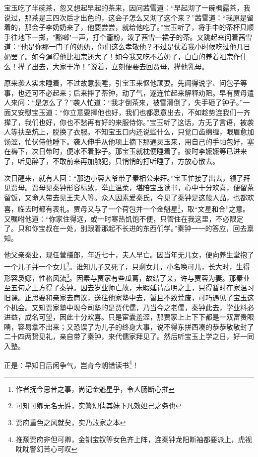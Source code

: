 \documentclass[12pt,oneside]{book}
\begin{document}
宝玉吃了半碗茶，忽又想起早起的茶来，因问茜雪道：“早起沏了一碗枫露茶，我说过，那茶是三四次后才出色的，这会子怎么又沏了这个来？”茜雪道：“我原是留着的，那会子李奶奶来了，他要尝尝，就给他吃了。”宝玉听了，将手中的茶杯只顺手往地下一掷，"豁啷"一声，打个齑粉，泼了茜雪一裙子的茶。又跳起来问着茜雪道：“他是你那一门子的奶奶，你们这么孝敬他？不过是仗着我小时候吃过他几日奶罢了。如今逞得他比祖宗还大了！如今我又吃不着奶了，白白的养着祖宗作什么！撵了出去，大家干净！”说着，立刻便要去回贾母，撵他乳母。

原来袭人实未睡着，不过故意装睡，引宝玉来怄他顽耍。先闻得说字、问包子等事，也还可不必起来；后来摔了茶钟，动了气，遂连忙起来解释劝阻。早有贾母遣人来问：“是怎么了？”袭人忙道：“我才倒茶来，被雪滑倒了，失手砸了钟子。”一面又安慰宝玉道：“你立意要撵他也好，我们也都愿意出去，不如趁势连我们一齐撵了，我们也好，你也不愁再有好的来服侍你。”宝玉听了这话，方无了言语，被袭人等扶至炕上，脱换了衣服。不知宝玉口内还说些什么，只觉口齿绵缠，眼眉愈加饧涩，忙伏侍他睡下。袭人伸手从他项上摘下那通灵玉来，用自己的手帕包好，塞在褥下，次日带时，便冰不着脖子。那宝玉就枕便睡着了。彼时李嬷嬷等已进来了，听见醉了，不敢前来再加触犯，只悄悄的打听睡了，方放心散去。

次日醒来，就有人回：“那边小蓉大爷带了秦相公来拜。”宝玉忙接了出去，领了拜见贾母。贾母见秦钟形容标致，举止温柔，堪陪宝玉读书，心中十分欢喜，便留茶留饭，又命人带去见王夫人等。众人因素爱秦氏，今见了秦钟是这般人品，也都欢喜，临去时都有表礼。贾母又与了一个荷包并一个金魁星\footnote{作者抚今思昔之事，尚记金魁星乎，令人肠断心摧}，取“文星和合”之意。又嘱咐他道：“你家住得远，或一时寒热饥饱不便，只管住在我这里，不必限定了。只和你宝叔在一处，别跟着那起不长进的东西们学。”秦钟一一的答应，回去禀知。

他父亲秦业，现任营缮郎，年近七十，夫人早亡。因当年无儿女，便向养生堂抱了一个儿子并一个女儿\footnote{可知可卿无名无姓，实警幻倩其妹下凡效妲己之务也}。谁知儿子又死了，只剩女儿，小名唤可儿，长大时，生得形容袅娜，性格风流\footnote{贾府重色之风就矣，实乃败家之本}。因素与贾家有些瓜葛，故结了亲，许与贾蓉为妻。那秦业至五旬之上方得了秦钟。因去岁业师亡故，未暇延请高明之士，只得暂时在家温习旧课。正思要和亲家去商议，送往他家塾中去，暂且不致荒废，可巧遇见了宝玉这个机会。又知贾家塾中现今司塾的是贾代儒，乃当今之老儒，秦钟此去，学业料必进益，成名可望，因此十分欢喜。只是宦囊羞涩，那贾家上上下下都是一双富贵眼睛，容易拿不出来；又恐误了为儿子的终身大事，说不得东拼西凑的恭恭敬敬封了二十四两贽见礼，亲自带了秦钟，来代儒家拜见了。然后听宝玉上学之日，好一同入塾。

正是：早知日后闲争气，岂肯今朝错读书\footnote{推颓贾府非但可卿，金钏宝钗等女色齐上阵，连秦钟龙阳断袖都要派上，虎视眈眈警幻苦心可叹}！
 
\end{document}
